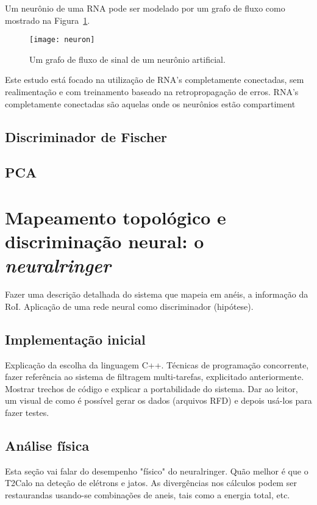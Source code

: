 Um neurônio de uma RNA pode ser modelado por um grafo de fluxo como mostrado
na Figura~\ref{fig:neuron}. 

\begin{figure}
\begin{center}
\texttt{[image: neuron]}
\end{center}
\caption{Um grafo de fluxo de sinal de um neurônio artificial.}
\label{fig:neuron}
\end{figure}

Este estudo está focado na utilização de RNA's completamente conectadas, sem
realimentação e com treinamento baseado na retropropagação de erros. RNA's
completamente conectadas são aquelas onde os neurônios estão compartiment

\subsection{Discriminador de Fischer}

\subsection{PCA}

\section{Mapeamento topológico e discriminação neural: o \emph{neuralringer}}

Fazer uma descrição detalhada do sistema que mapeia em anéis, a informação da
RoI. Aplicação de uma rede neural como discriminador (hipótese).

\subsection{Implementação inicial}

Explicação da escolha da linguagem C++. Técnicas de programação concorrente,
fazer referência ao sistema de filtragem multi-tarefas, explicitado
anteriormente. Mostrar trechos de código e explicar a portabilidade do
sistema. Dar ao leitor, um visual de como é possível gerar os dados (arquivos
RFD) e depois usá-los para fazer testes.

\subsection{Análise física}

Esta seção vai falar do desempenho "físico" do neuralringer. Quão melhor é que
o T2Calo na deteção de elétrons e jatos. As divergências nos cálculos podem
ser restaurandas usando-se combinações de aneis, tais como a energia total,
etc.

